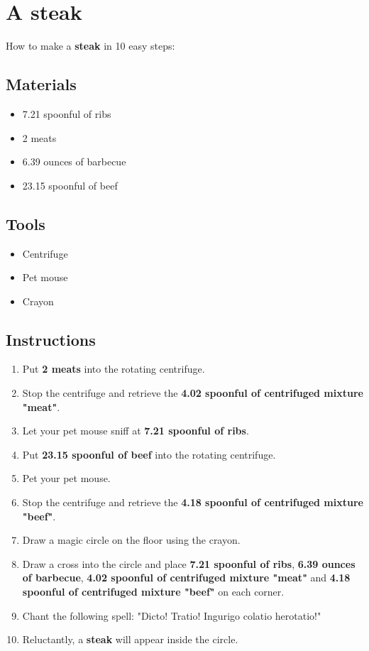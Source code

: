 \documentclass{article}
\begin{document}
\section{A steak}How to make a \textbf{steak} in 10 easy steps:

\subsection{Materials}\begin{itemize}
\item 
7.21 spoonful of ribs
\item 
2 meats
\item 
6.39 ounces of barbecue
\item 
23.15 spoonful of beef
\end{itemize}
\subsection{Tools}\begin{itemize}
\item 
Centrifuge
\item 
Pet mouse
\item 
Crayon
\end{itemize}
\subsection{Instructions}\begin{enumerate}
\item 
Put \textbf{2 meats} into the rotating centrifuge.
\item 
Stop the centrifuge and retrieve the \textbf{4.02 spoonful of centrifuged mixture "meat"}.
\item 
Let your pet mouse sniff at \textbf{7.21 spoonful of ribs}.
\item 
Put \textbf{23.15 spoonful of beef} into the rotating centrifuge.
\item 
Pet your pet mouse.
\item 
Stop the centrifuge and retrieve the \textbf{4.18 spoonful of centrifuged mixture "beef"}.
\item 
Draw a magic circle on the floor using the crayon.
\item 
Draw a cross into the circle and place \textbf{7.21 spoonful of ribs}, \textbf{6.39 ounces of barbecue}, \textbf{4.02 spoonful of centrifuged mixture "meat"} and \textbf{4.18 spoonful of centrifuged mixture "beef"} on each corner.
\item 
Chant the following spell: "Dicto! Tratio! Ingurigo colatio herotatio!"
\item 
Reluctantly, a \textbf{steak} will appear inside the circle.
\end{enumerate}
\newpage
\end{document}
